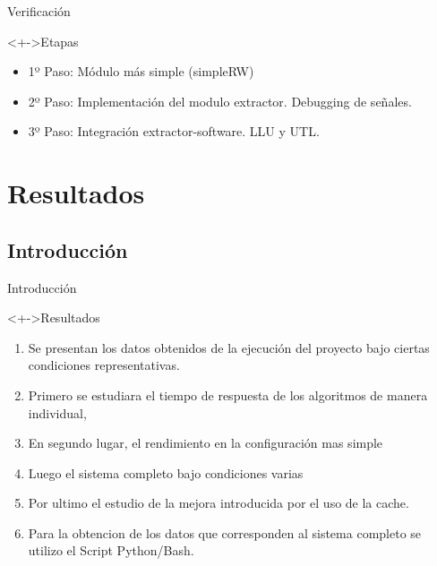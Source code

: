 \documentclass[xcolor=dvipsnames]{beamer}
\begin{document}
\begin{frame}{Verificación}
\begin{block}<+->{Etapas}   
    \begin{itemize}
      \scriptsize
     	\item 1º Paso: Módulo más simple (simpleRW)
     	\item 2º Paso: Implementación del modulo extractor. Debugging de señales.
     	\item 3º Paso: Integración extractor-software. LLU y UTL.
    \end{itemize}
  \end{block}
\end{frame}



\section{Resultados}
\subsection{Introducción}
\begin{frame}{Introducción}
	\begin{block}<+->{Resultados}  
	 \begin{enumerate}	
		\item Se presentan los datos obtenidos de la ejecución del proyecto bajo ciertas condiciones representativas. 
		\item Primero se estudiara el tiempo de respuesta de los algoritmos de manera individual, 
		\item En segundo lugar,  el rendimiento en la configuración mas simple
		\item Luego el sistema completo bajo condiciones varias
		\item Por ultimo el estudio de la mejora introducida por el uso de la cache. 
		\item Para la obtencion de los datos que corresponden al sistema completo se utilizo el Script Python/Bash.
	\end{enumerate}
  \end{block}
\end{frame}
\end{document}
